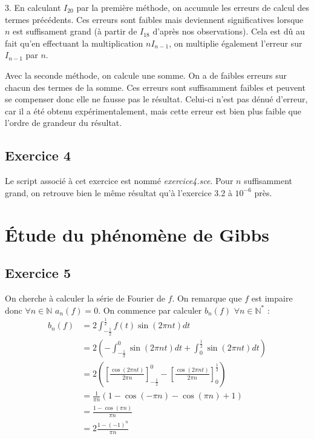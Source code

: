 \documentclass[a4paper,11pt]{article}
\begin{document}
	3. En calculant $I_{20}$ par la première méthode, on accumule les erreurs de calcul des termes précédents. Ces erreurs sont faibles mais deviennent significatives lorsque $n$ est suffisament grand (à partir de $I_{18}$ d'après nos observations). Cela est dû au fait qu'en effectuant la multiplication $nI_{n-1}$, on multiplie également l'erreur sur $I_{n-1}$ par $n$.
	
	Avec la seconde méthode, on calcule une somme. On a de faibles erreurs sur chacun des termes de la somme. Ces erreurs sont suffisamment faibles et peuvent se compenser donc elle ne fausse pas le résultat. Celui-ci n'est pas dénué d'erreur, car il a été obtenu expérimentalement, mais cette erreur est bien plus faible que l'ordre de grandeur du résultat.

\subsection*{Exercice 4}
	Le script associé à cet exercice est nommé \textit{exercice4.sce}. Pour $n$ suffisamment grand, on retrouve bien le même résultat qu'à l'exercice 3.2 à $10^{-6}$ près.


\section{Étude du phénomène de Gibbs}

\subsection*{Exercice 5}
	On cherche à calculer la série de Fourier de $f$. On remarque que $f$ est impaire donc $\forall n \in \mathbb{N} $ $a_{n}(f) = 0$.
	On commence par calculer $b_{n}(f)$ $\forall n \in \mathbb{N}^{*}$ :
	\begin{align*}
		b_{n}(f)
		& = 2 \int_{-\frac{1}{2}}^{\frac{1}{2}} f(t) \sin (2 \pi n t) dt \\
		& = 2 \left ( - \int_{-\frac{1}{2}}^{0} \sin (2 \pi n t) dt + \int_{0}^{\frac{1}{2}} \sin (2 \pi n t) dt \right ) \\
		& = 2 \left ( \left [ \frac{\cos ( 2 \pi n t)}{2 \pi n} \right ]_{-\frac{1}{2}}^{0} - \left [ \frac{\cos ( 2 \pi n t)}{2 \pi n} \right ]_{0}^{\frac{1}{2}} \right ) \\
		& = \frac{1}{\pi n} \left ( 1 - \cos (- \pi n) - \cos ( \pi n) + 1 \right ) \\
		& = \frac{1 - \cos (\pi n)}{\pi n} \\
		& = 2 \frac{1-(-1)^{n}}{\pi n}
	\end{align*}
\end{document}
